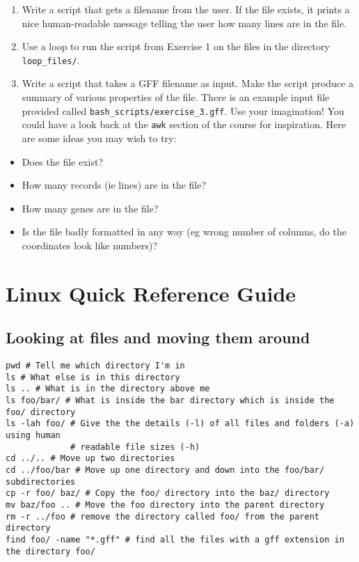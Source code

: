 \documentclass[11pt]{article}
\providecommand{\tightlist}{%
      \setlength{\itemsep}{0pt}\setlength{\parskip}{0pt}}
\begin{document}
\begin{enumerate}
\def\labelenumi{\arabic{enumi}.}
\tightlist
\item
  Write a script that gets a filename from the user. If the file exists,
  it prints a nice human-readable message telling the user how many
  lines are in the file.
\item
  Use a loop to run the script from Exercise 1 on the files in the
  directory \texttt{loop\_files/}.
\item
  Write a script that takes a GFF filename as input. Make the script
  produce a summary of various properties of the file. There is an
  example input file provided called
  \texttt{bash\_scripts/exercise\_3.gff}. Use your imagination! You
  could have a look back at the \texttt{awk} section of the course for
  inspiration. Here are some ideas you may wish to try:
\end{enumerate}

\begin{itemize}
\tightlist
\item
  Does the file exist?
\item
  How many records (ie lines) are in the file?
\item
  How many genes are in the file?
\item
  Is the file badly formatted in any way (eg wrong number of columns, do
  the coordinates look like numbers)?
\end{itemize}





\newpage





    \hypertarget{linux-quick-reference-guide}{%
\section{Linux Quick Reference
Guide}\label{linux-quick-reference-guide}}

\hypertarget{looking-at-files-and-moving-them-around}{%
\subsection{Looking at files and moving them
around}\label{looking-at-files-and-moving-them-around}}

\begin{verbatim}
pwd # Tell me which directory I'm in
ls # What else is in this directory
ls .. # What is in the directory above me
ls foo/bar/ # What is inside the bar directory which is inside the foo/ directory
ls -lah foo/ # Give the the details (-l) of all files and folders (-a) using human
             # readable file sizes (-h)
cd ../.. # Move up two directories
cd ../foo/bar # Move up one directory and down into the foo/bar/ subdirectories
cp -r foo/ baz/ # Copy the foo/ directory into the baz/ directory
mv baz/foo .. # Move the foo directory into the parent directory
rm -r ../foo # remove the directory called foo/ from the parent directory
find foo/ -name "*.gff" # find all the files with a gff extension in the directory foo/
\end{verbatim}
\end{document}
